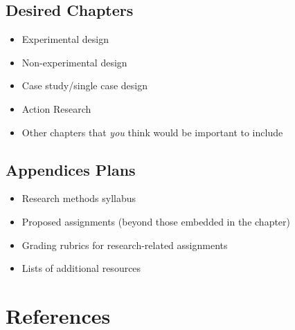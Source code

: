 \documentclass[
  11pt,
]{book}
\providecommand{\tightlist}{%
  \setlength{\itemsep}{0pt}\setlength{\parskip}{0pt}}
\begin{document}
\hypertarget{desired-chapters}{%
\section{Desired Chapters}\label{desired-chapters}}

\begin{itemize}
\tightlist
\item
  Experimental design
\item
  Non-experimental design
\item
  Case study/single case design
\item
  Action Research
\item
  Other chapters that \emph{you} think would be important to include
\end{itemize}

\hypertarget{appendices-plans}{%
\section{Appendices Plans}\label{appendices-plans}}

\begin{itemize}
\tightlist
\item
  Research methods syllabus
\item
  Proposed assignments (beyond those embedded in the chapter)
\item
  Grading rubrics for research-related assignments
\item
  Lists of additional resources
\end{itemize}

\hypertarget{references-4}{%
\chapter{References}\label{references-4}}

  
\end{document}
